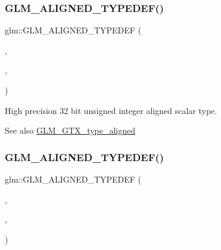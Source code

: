\subsubsection{\texorpdfstring{G\+L\+M\+\_\+\+A\+L\+I\+G\+N\+E\+D\+\_\+\+T\+Y\+P\+E\+D\+E\+F()}{GLM\_ALIGNED\_TYPEDEF()}\hspace{0.1cm}{\footnotesize\ttfamily [103/209]}}
{\footnotesize\ttfamily glm\+::\+G\+L\+M\+\_\+\+A\+L\+I\+G\+N\+E\+D\+\_\+\+T\+Y\+P\+E\+D\+EF (\begin{DoxyParamCaption}\item[{\hyperlink{group__gtc__type__precision_gae8e8a2c712653891a03c171795286ac5}{highp\+\_\+u32}}]{,  }\item[{aligned\+\_\+highp\+\_\+u32}]{,  }\item[{4}]{ }\end{DoxyParamCaption})}

High precision 32 bit unsigned integer aligned scalar type. \begin{DoxySeeAlso}{See also}
\hyperlink{group__gtx__type__aligned}{G\+L\+M\+\_\+\+G\+T\+X\+\_\+type\+\_\+aligned} 
\end{DoxySeeAlso}
\mbox{\label{group__gtx__type__aligned_ga92024d27c74a3650afb55ec8e024ed25}} 
\subsubsection{\texorpdfstring{G\+L\+M\+\_\+\+A\+L\+I\+G\+N\+E\+D\+\_\+\+T\+Y\+P\+E\+D\+E\+F()}{GLM\_ALIGNED\_TYPEDEF()}\hspace{0.1cm}{\footnotesize\ttfamily [104/209]}}
{\footnotesize\ttfamily glm\+::\+G\+L\+M\+\_\+\+A\+L\+I\+G\+N\+E\+D\+\_\+\+T\+Y\+P\+E\+D\+EF (\begin{DoxyParamCaption}\item[{\hyperlink{group__gtc__type__precision_ga6006ea883d3c0491791650b2fb84de39}{highp\+\_\+u64}}]{,  }\item[{aligned\+\_\+highp\+\_\+u64}]{,  }\item[{8}]{ }\end{DoxyParamCaption})}

